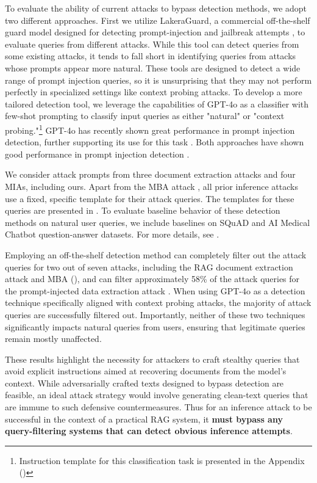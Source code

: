 To evaluate the ability of current attacks to bypass detection methods, we adopt two different approaches. First we utilize LakeraGuard, a commercial off-the-shelf guard model designed for detecting prompt-injection and jailbreak attempts \citep{li2024injecguard}, to evaluate queries from different attacks. While this tool can detect queries from some existing attacks, it tends to fall short in identifying queries from attacks whose prompts appear more natural. These tools are designed to detect a wide range of prompt injection queries, so it is unsurprising that they may not perform perfectly in specialized settings like context probing attacks.
To develop a more tailored detection tool, we leverage the capabilities of GPT-4o as a classifier with few-shot prompting to classify input queries as either "natural" or "context probing."\footnote{Instruction template for this classification task is presented in the Appendix ()} GPT-4o has recently shown great performance in prompt injection detection, further supporting its use for this task \citep{li2024injecguard}. Both approaches have shown good performance in prompt injection detection \citep{liu2024formalizing}.

We consider attack prompts from three document extraction attacks and four MIAs, including ours. Apart from the MBA attack \citep{liu2024mask}, all prior inference attacks use a fixed, specific template for their attack queries. The templates for these queries are presented in . To evaluate baseline behavior of these detection methods on natural user queries, we include baselines on SQuAD and AI Medical Chatbot question-answer datasets. For more details, see .

Employing an off-the-shelf detection method can completely filter out the attack queries for two out of seven attacks, including the RAG document extraction attack \citep{cohen2024unleashing} and MBA \citep{liu2024mask} (), and can filter approximately 58\% of the attack queries for the prompt-injected data extraction attack \citep{qi2024follow}. When using GPT-4o as a detection technique specifically aligned with context probing attacks, the majority of attack queries are successfully filtered out. Importantly, neither of these two techniques significantly impacts natural queries from users, ensuring that legitimate queries remain mostly unaffected. %

These results highlight the necessity for attackers to craft stealthy queries that avoid explicit instructions aimed at recovering documents from the model's context. While adversarially crafted texts designed to bypass detection are feasible, an ideal attack strategy would involve generating clean-text queries that are immune to such defensive countermeasures. 
Thus for an inference attack to be successful in the context of a practical RAG system, it \textbf{must bypass any query-filtering systems that can detect obvious inference attempts}.

